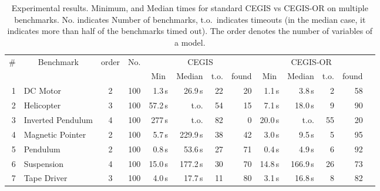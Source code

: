 \documentclass[sigconf]{llncs}
\begin{document}
\begin{table}
\centering
\footnotesize
%
\begin{tabular}{| r | l | c | c | r | r | r | r | r | r | r | r | r |}
%
\hline
\# & \multicolumn{1}{|c|}{Benchmark} & \multicolumn{1}{|c|}{order} & \multicolumn{1}{|c|}{No.} & \multicolumn{4}{|c|}{CEGIS} & \multicolumn{4}{|c|}{CEGIS-OR} \\
   &                                 & & \multicolumn{1}{|c|}{}  & \multicolumn{1}{|c|}{Min} & \multicolumn{1}{|c|}{Median} & \multicolumn{1}{|c|}{t.o.} & \multicolumn{1}{|c|}{found} & \multicolumn{1}{|c|}{Min} & \multicolumn{1}{|c|}{Median} & \multicolumn{1}{|c|}{t.o.} & \multicolumn{1}{|c|}{found}\\\hline
1  & DC Motor          & 2 & 100 & 1.3\,s & 26.9\,s& 22& 20& 1.1\,s &   3.8\,s & 2 & 58\\
2  & Helicopter        & 3  & 100 & 57.2\,s & t.o. & 54 & 15 & 7.1\,s  &   18.0\,s & 9 & 90\\
3  & Inverted Pendulum & 4 & 100 &  277\,s& t.o. & 82& 0 & 20.0\,s  &  t.o. & 55 & 20\\
4  & Magnetic Pointer  & 2  & 100 & 5.7\,s & 229.9\,s & 38 & 42 & 3.0\,s  &  9.5\,s & 5 & 95 \\
5  & Pendulum          & 2 & 100 & 0.8\,s & 53.6\,s & 27 & 71 &0.4\,s  &   4.9\,s & 6 & 92\\
6  & Suspension        & 4 & 100 &15.0\,s & 177.2\,s & 30 & 70 & 14.8\,s&166.9\,s  & 26 & 73\\
7  & Tape Driver       & 3 & 100 & 4.0\,s& 17.7\,s & 11 & 80 &3.1\,s  &   16.8\,s & 8 & 82\\
\hline
%
\end{tabular}
\vspace{0.05in}
\caption{\label{tab:cegis_results}
Experimental results.  Minimum, and Median times for standard CEGIS vs
CEGIS-OR on multiple benchmarks.  No.  indicates Number of benchmarks,
t.o.~indicates timeouts (in the median case, it indicates more than half of
the benchmarks timed out).  The order denotes the number of variables of a
model.}
%
\end{table}
\end{document}
